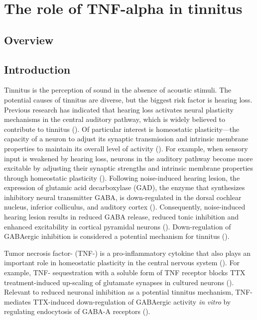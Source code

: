 \chapter{The role of TNF-alpha in tinnitus}

\section{Overview}

\newrefsection

\section{Introduction}
Tinnitus is the perception of sound in the absence of acoustic stimuli. The potential causes of tinnitus are diverse, but the biggest risk factor is hearing loss. Previous research has indicated that hearing loss activates neural plasticity mechanisms in the central auditory pathway, which is widely believed to contribute to tinnitus (\cite{Roberts2010}). Of particular interest is homeostatic plasticity---the capacity of a neuron to adjust its synaptic transmission and intrinsic membrane properties to maintain its overall level of activity (\cite{Turrigiano1999, Davis2001}). For example, when sensory input is weakened by hearing loss, neurons in the auditory pathway become more excitable by adjusting their synaptic strengths and intrinsic membrane properties through homeostatic plasticity (\cite{Kotak2005, Yang2011a, Yang2012}). Following noise-induced hearing lesion, the expression of glutamic acid decarboxylase (GAD), the enzyme that synthesizes inhibitory neural transmitter GABA, is down-regulated in the dorsal cochlear nucleus, inferior colliculus, and auditory cortex (\cite{Abbott1999, Milbrandt2000, Yang2011a, Browne2012}). Consequently, noise-induced hearing lesion results in reduced GABA release, reduced tonic inhibition and enhanced excitability in cortical pyramidal neurons (\cite{Yang2011a, Yang2012}). Down-regulation of GABAergic inhibition is considered a potential mechanism for tinnitus (\cite{Yang2011a, Llano2012}).

Tumor necrosis factor-\textalpha{} (TNF-\textalpha{}) is a pro-inflammatory cytokine that also plays an important role in homeostatic plasticity in the central nervous system (\cite{Stellwagen2005, Stellwagen2006, Steinmetz2010, Wang2011}). For example, TNF-\textalpha{} sequestration with a soluble form of TNF receptor blocks TTX treatment-induced up-scaling of glutamate synapses in cultured neurons (\cite{Stellwagen2006, Steinmetz2010}). Relevant to reduced neuronal inhibition as a potential tinnitus mechanism, TNF-\textalpha{} mediates TTX-induced down-regulation of GABAergic activity \textit{in vitro} by regulating endocytosis of GABA-A receptors (\cite{Stellwagen2005, Stellwagen2006}).

